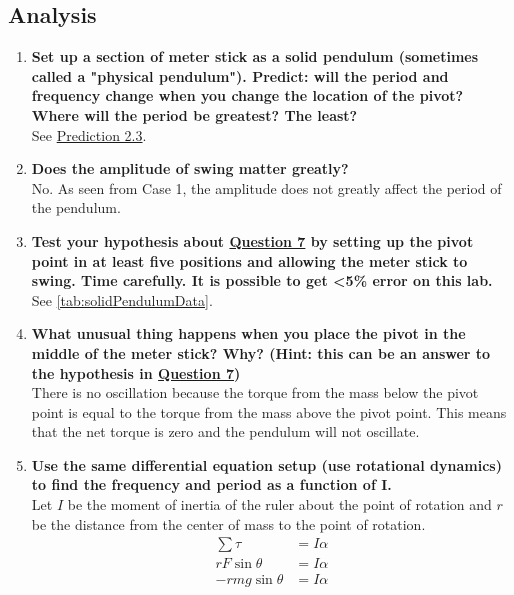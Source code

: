 \documentclass[article, 12pt]{article}
\begin{document}
\subsection{Analysis}
\begin{enumerate}[1)]
    \item\label{q:hypothesis} \textbf{Set up a section of meter stick as a solid pendulum (sometimes called a "physical pendulum"). Predict: will the period and frequency change when you change the location of the pivot? Where will the period be greatest? The least?} \\
    See \hyperref[subsec:prediction]{Prediction 2.3}.
    \item \textbf{Does the amplitude of swing matter greatly?} \\
    No. As seen from Case 1, the amplitude does not greatly affect the period of the pendulum. 
    \item \textbf{Test your hypothesis about \hyperref[q:hypothesis]{Question 7} by setting up the pivot point in at least five positions and allowing the meter stick to swing. Time carefully. It is possible to get \textless 5\% error on this lab.} \\
    See \autoref{tab:solidPendulumData}.
    \item \textbf{What unusual thing happens when you place the pivot in the middle of the meter stick?  Why?  (Hint: this can be an answer to the hypothesis in \hyperref[q:hypothesis]{Question 7})} \\
    There is no oscillation because the torque from the mass below the pivot point is equal to the torque from the mass above the pivot point. This means that the net torque is zero and the pendulum will not oscillate.
    \item \textbf{Use the same differential equation setup (use rotational dynamics) to find the frequency and period as a function of I.} \\
    Let $I$ be the moment of inertia of the ruler about the point of rotation and $r$ be the distance from the center of mass to the point of rotation. \\
    \begin{align}
        \sum \tau &= I\alpha \nonumber\\
        rF\sin{\theta} &= I\alpha \nonumber\\
        -rmg\sin{\theta} &= I\alpha 
    \end{align}

\end{enumerate}
\end{document}
